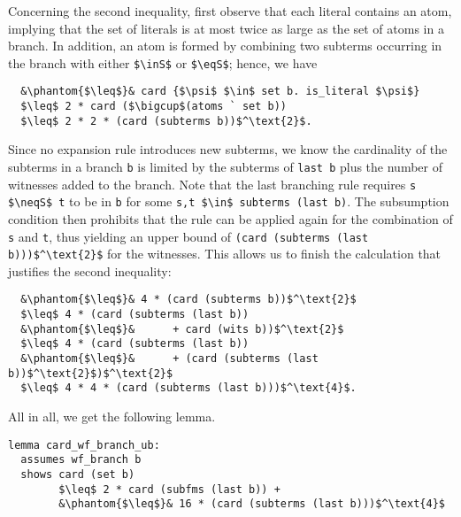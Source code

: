 \documentclass[sigplan,10pt,anonymous,review]{acmart}
\newcommand{\inS}{\in_\text{s}}
\newcommand{\eqS}{=_\text{s}}
\newcommand{\neqS}{\neq_\text{s}}
\begin{document}
Concerning the second inequality, first observe that each literal contains an atom, implying that the set of literals is at most twice as large as the set of atoms in a branch. 
In addition, an atom is formed by combining two subterms occurring in the branch with either \lstinline!$\inS$! or \lstinline!$\eqS$!;
hence, we have
\begin{lstlisting}
  &\phantom{$\leq$}& card {$\psi$ $\in$ set b. is_literal $\psi$}
  $\leq$ 2 * card ($\bigcup$(atoms ` set b))
  $\leq$ 2 * 2 * (card (subterms b))$^\text{2}$.
\end{lstlisting}
Since no expansion rule introduces new subterms, we know the cardinality of the subterms in a branch \lstinline!b! is limited by the subterms of \lstinline!last b! plus the number of witnesses added to the branch.
Note that the last branching rule requires \lstinline!s $\neqS$ t! to be in \lstinline!b! for some \lstinline!s,t $\in$ subterms (last b)!.
The subsumption condition then prohibits that the rule can be applied again for the combination of \lstinline!s! and \lstinline!t!, thus yielding an upper bound of \lstinline!(card (subterms (last b)))$^\text{2}$! for the witnesses.
This allows us to finish the calculation that justifies the second inequality:
\begin{lstlisting}
  &\phantom{$\leq$}& 4 * (card (subterms b))$^\text{2}$
  $\leq$ 4 * (card (subterms (last b))
  &\phantom{$\leq$}&      + card (wits b))$^\text{2}$
  $\leq$ 4 * (card (subterms (last b))
  &\phantom{$\leq$}&      + (card (subterms (last b))$^\text{2}$)$^\text{2}$
  $\leq$ 4 * 4 * (card (subterms (last b)))$^\text{4}$.
\end{lstlisting}
All in all, we get the following lemma.
\begin{lstlisting}[label={lst:card_branch}]
lemma card_wf_branch_ub:
  assumes wf_branch b
  shows card (set b)
        $\leq$ 2 * card (subfms (last b)) +
        &\phantom{$\leq$}& 16 * (card (subterms (last b)))$^\text{4}$
\end{lstlisting}
\end{document}
